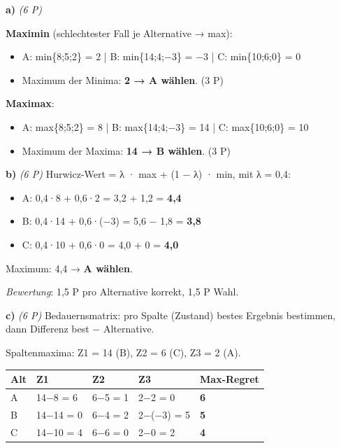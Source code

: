 \documentclass[11pt, a4paper]{article}
\begin{document}
\textbf{a)} \textit{(6 P)}

\textbf{Maximin} (schlechtester Fall je Alternative → max):

\begin{itemize}
  \item A: min\{8;5;2\} = 2 | B: min\{14;4;−3\} = −3 | C: min\{10;6;0\} = 0
  \item Maximum der Minima: \textbf{2 → A wählen}. (3 P)
\end{itemize}

\textbf{Maximax}:

\begin{itemize}
  \item A: max\{8;5;2\} = 8 | B: max\{14;4;−3\} = 14 | C: max\{10;6;0\} = 10
  \item Maximum der Maxima: \textbf{14 → B wählen}. (3 P)
\end{itemize}

\textbf{b)} \textit{(6 P)} Hurwicz-Wert = λ · max + (1 − λ) · min, mit λ = 0,4:

\begin{itemize}
  \item A: 0,4·8 + 0,6·2 = 3,2 + 1,2 = \textbf{4,4}
  \item B: 0,4·14 + 0,6·(−3) = 5,6 − 1,8 = \textbf{3,8}
  \item C: 0,4·10 + 0,6·0 = 4,0 + 0 = \textbf{4,0}
\end{itemize}
Maximum: 4,4 → \textbf{A wählen}.

\textit{Bewertung}: 1,5 P pro Alternative korrekt, 1,5 P Wahl.


\textbf{c)} \textit{(6 P)} Bedauernsmatrix: pro Spalte (Zustand) bestes Ergebnis bestimmen, dann Differenz best − Alternative.

Spaltenmaxima: Z1 = 14 (B), Z2 = 6 (C), Z3 = 2 (A).



{\small
\begin{tabularx}{\linewidth}{XXXXX}
\hline
\rowcolor{tableheadbg}
{\color{white}\textbf{Alt}} & {\color{white}\textbf{Z1}} & {\color{white}\textbf{Z2}} & {\color{white}\textbf{Z3}} & {\color{white}\textbf{Max-Regret}} \\[2pt]
\hline
\endhead
\hline
\endfoot
A & 14−8 = 6 & 6−5 = 1 & 2−2 = 0 & \textbf{6} \\
B & 14−14 = 0 & 6−4 = 2 & 2−(−3) = 5 & \textbf{5} \\
C & 14−10 = 4 & 6−6 = 0 & 2−0 = 2 & \textbf{4} \\
\end{tabularx}
}
\end{document}

